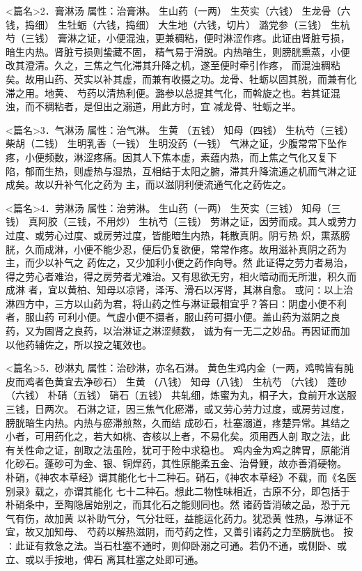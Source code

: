 \documentclass[a4paper,12pt,UTF8,twoside]{ctexbook}
\begin{document}
<篇名>2．膏淋汤
属性：治膏淋。 
生山药（一两） 生芡实（六钱） 生龙骨（六钱，捣细） 生牡蛎（六钱，捣细） 大生地（六钱，切片） 
潞党参（三钱） 生杭芍（三钱） 
膏淋之证，小便混浊，更兼稠粘，便时淋涩作疼。此证由肾脏亏损，暗生内热。肾脏亏损则蛰藏不固， 
精气易于滑脱。内热暗生，则膀胱熏蒸，小便改其澄清。久之，三焦之气化滞其升降之机，遂至便时牵引作疼， 
而混浊稠粘矣。故用山药、芡实以补其虚，而兼有收摄之功。龙骨、牡蛎以固其脱，而兼有化滞之用。地黄、 
芍药以清热利便。潞参以总提其气化，而斡旋之也。若其证混浊，而不稠粘者，是但出之溺道，用此方时，宜 
减龙骨、牡蛎之半。 


<篇名>3．气淋汤
属性：治气淋。 
生黄 （五钱） 知母（四钱） 生杭芍（三钱） 柴胡（二钱） 生明乳香（一钱） 生明没药（一钱） 
气淋之证，少腹常常下坠作疼，小便频数，淋涩疼痛。因其人下焦本虚，素蕴内热，而上焦之气化又复下 
陷，郁而生热，则虚热与湿热，互相结于太阳之腑，滞其升降流通之机而气淋之证成矣。故以升补气化之药为 
主，而以滋阴利便流通气化之药佐之。 


<篇名>4．劳淋汤
属性：治劳淋。 
生山药（一两） 生芡实（三钱） 知母（三钱） 真阿胶（三钱，不用炒） 生杭芍（三钱） 
劳淋之证，因劳而成。其人或劳力过度、或劳心过度、或房劳过度，皆能暗生内热，耗散真阴。阴亏热 
炽，熏蒸膀胱，久而成淋，小便不能少忍，便后仍复欲便，常常作疼。故用滋补真阴之药为主，而少以补气之 
药佐之，又少加利小便之药作向导。然 
此证得之劳力者易治，得之劳心者难治，得之房劳者尤难治。又有思欲无穷，相火暗动而无所泄，积久而成淋 
者，宜以黄柏、知母以凉肾，泽泻、滑石以泻肾，其淋自愈。 
或问∶以上治淋四方中，三方以山药为君，将山药之性与淋证最相宜乎？答曰∶阴虚小便不利者，服山药 
可利小便。气虚小便不摄者，服山药可摄小便。盖山药为滋阴之良药，又为固肾之良药，以治淋证之淋涩频数， 
诚为有一无二之妙品。再因证而加以他药辅佐之，所以投之辄效也。 


<篇名>5．砂淋丸
属性：治砂淋，亦名石淋。 
黄色生鸡内金（一两，鸡鸭皆有肫皮而鸡者色黄宜去净砂石） 生黄 （八钱） 知母（八钱） 生杭芍 
（六钱） 蓬砂（六钱） 朴硝（五钱） 硝石（五钱） 
共轧细，炼蜜为丸，桐子大，食前开水送服三钱，日两次。 
石淋之证，因三焦气化瘀滞，或又劳心劳力过度，或房劳过度，膀胱暗生内热。内热与瘀滞煎熬，久而结 
成砂石，杜塞溺道，疼楚异常。其结之小者，可用药化之，若大如桃、杏核以上者，不易化矣。须用西人剖 
取之法，此有关性命之证，剖取之法虽险，犹可于险中求稳也。 
鸡内金为鸡之脾胃，原能消化砂石。蓬砂可为金、银、铜焊药，其性原能柔五金、治骨鲠，故亦善消硬物。 
朴硝，《神农本草经》谓其能化七十二种石。硝石，《神农本草经》不载，而《名医别录》载之，亦谓其能化 
七十二种石。想此二物性味相近，古原不分，即包括于朴硝条中，至陶隐居始别之，而其化石之能则同也。然 
诸药皆消破之品，恐于元气有伤，故加黄 以补助气分，气分壮旺，益能运化药力。犹恐黄 性热，与淋证不 
宜，故又加知母、 
芍药以解热滋阴，而芍药之性，又善引诸药之力至膀胱也。 
按∶此证有救急之法。当石杜塞不通时，则仰卧溺之可通。若仍不通，或侧卧、或立、或以手按地，俾石 
离其杜塞之处即可通。 
\end{document}
